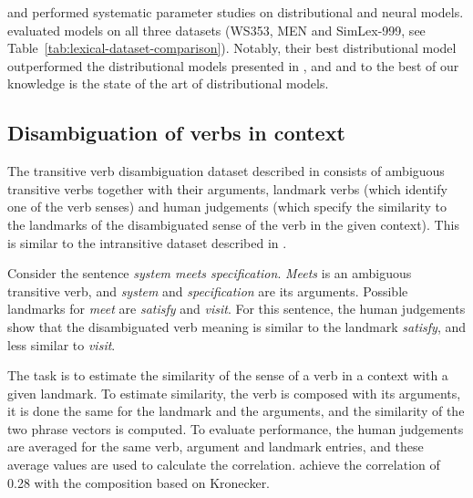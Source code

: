 
 and  performed systematic parameter studies on distributional and neural models.  evaluated models on all three datasets (WS353, MEN and SimLex-999, see Table~\ref{tab:lexical-dataset-comparison}). Notably, their best distributional model outperformed the distributional models presented in \citet{hill2014simlex}, \citet{kiela-clark:2014:CVSC} and \citet{baroni-dinu-kruszewski:2014:P14-1} and to the best of our knowledge is the state of the art of distributional models.

\subsection{Disambiguation of verbs in context}
\label{sec:disamb}

The transitive verb disambiguation dataset
described in \citet{Grefenstette:2011:ETV:2140490.2140497,Grefenstette:2011:ESC:2145432.2145580} consists of ambiguous transitive verbs together with their arguments, landmark verbs (which identify one of the verb senses) and human judgements (which specify the similarity to the landmarks of the disambiguated sense of the verb in the given context). This is similar to the intransitive dataset described in .

Consider the sentence \textit{system meets specification}. \textit{Meets} is an ambiguous transitive verb, and \textit{system}
and \textit{specification} are its arguments. Possible landmarks for \emph{meet} are \textit{satisfy} and \textit{visit}. For this sentence, the human judgements show that the disambiguated verb meaning is similar to the landmark \textit{satisfy}, and less similar to \textit{visit}.

The task is to estimate the similarity of the sense of a verb in a context with a given landmark. To estimate similarity, the verb is composed with its arguments, it is done the same for the landmark and the arguments, and the similarity of the two phrase vectors is computed. To evaluate performance, the human judgements are averaged for the same verb, argument and landmark entries, and these average values are used to calculate the correlation. \citet{Grefenstette:2011:ETV:2140490.2140497} achieve the correlation of 0.28 with the composition based on Kronecker.

